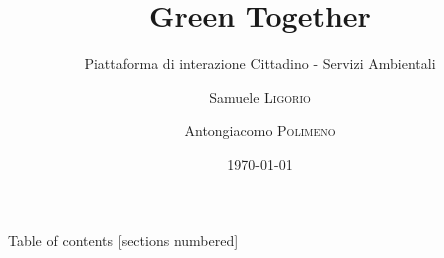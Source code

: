 \documentclass[xcolor={x11names,table}]{beamer}
\title{\vspace*{2.5cm}Green Together}
\subtitle{Piattaforma di interazione Cittadino - Servizi Ambientali}
\date{\today}
\author{Samuele \textsc{Ligorio} \and Antongiacomo \textsc{Polimeno}}
\institute{Università Degli Studi Di Milano}
\begin{document}
\maketitle

\begin{frame}{Table of contents}
  [sections numbered]
  \tableofcontents
\end{frame}



\end{document}
